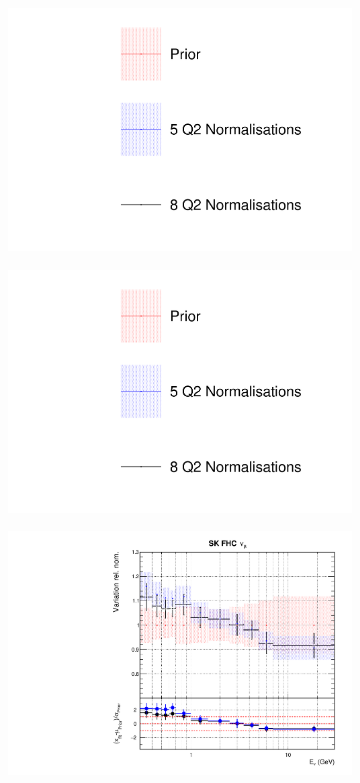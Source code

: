 \begin{figure}
\centering
\begin{subfigure}{0.3\textwidth}
  \centering
  \includegraphics[width=1.0\linewidth, trim={5mm  130mm 0mm 10mm}, clip]{figs/comp5q2vs8q2_leg}
\end{subfigure}
\begin{subfigure}{0.3\textwidth}
  \centering
  \includegraphics[width=1.0\linewidth, trim={5mm  0mm 0mm 70mm}, clip]{figs/comp5q2vs8q2_leg}
\end{subfigure}
\begin{subfigure}{0.45\textwidth}
  \centering
  \includegraphics[width=0.75\linewidth]{figs/comp5q2vs8q2flux8}

\end{subfigure}
\end{figure}
